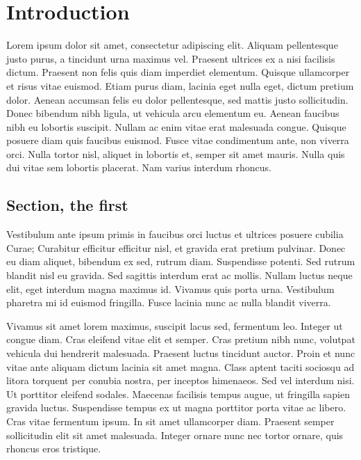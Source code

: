 %
%

\chapter{Introduction}
\label{Ch:Intro}

Lorem ipsum dolor sit amet, consectetur adipiscing elit. Aliquam pellentesque justo
purus, a tincidunt urna maximus vel. Praesent ultrices ex a nisi facilisis dictum.
Praesent non felis quis diam imperdiet elementum. Quisque ullamcorper et risus vitae
euismod. Etiam purus diam, lacinia eget nulla eget, dictum pretium dolor. Aenean
accumsan felis eu dolor pellentesque, sed mattis justo sollicitudin. Donec bibendum nibh
ligula, ut vehicula arcu elementum eu. Aenean faucibus nibh eu lobortis suscipit. Nullam
ac enim vitae erat malesuada congue. Quisque posuere diam quis faucibus euismod. Fusce
vitae condimentum ante, non viverra orci. Nulla tortor nisl, aliquet in lobortis et,
semper sit amet mauris. Nulla quis dui vitae sem lobortis placerat. Nam varius interdum
rhoncus.

\section{Section, the first}

Vestibulum ante ipsum primis in faucibus orci luctus et ultrices posuere cubilia Curae;
Curabitur efficitur efficitur nisl, et gravida erat pretium pulvinar. Donec eu diam
aliquet, bibendum ex sed, rutrum diam. Suspendisse potenti. Sed rutrum blandit nisl eu
gravida. Sed sagittis interdum erat ac mollis. Nullam luctus neque elit, eget interdum
magna maximus id. Vivamus quis porta urna. Vestibulum pharetra mi id euismod fringilla.
Fusce lacinia nunc ac nulla blandit viverra.

Vivamus sit amet lorem maximus, suscipit lacus sed, fermentum leo. Integer ut congue
diam. Cras eleifend vitae elit et semper. Cras pretium nibh nunc, volutpat vehicula dui
hendrerit malesuada. Praesent luctus tincidunt auctor. Proin et nunc vitae ante aliquam
dictum lacinia sit amet magna. Class aptent taciti sociosqu ad litora torquent per
conubia nostra, per inceptos himenaeos. Sed vel interdum nisi. Ut porttitor eleifend
sodales. Maecenas facilisis tempus augue, ut fringilla sapien gravida luctus.
Suspendisse tempus ex ut magna porttitor porta vitae ac libero. Cras vitae fermentum
ipsum. In sit amet ullamcorper diam. Praesent semper sollicitudin elit sit amet
malesuada. Integer ornare nunc nec tortor ornare, quis rhoncus eros tristique.

